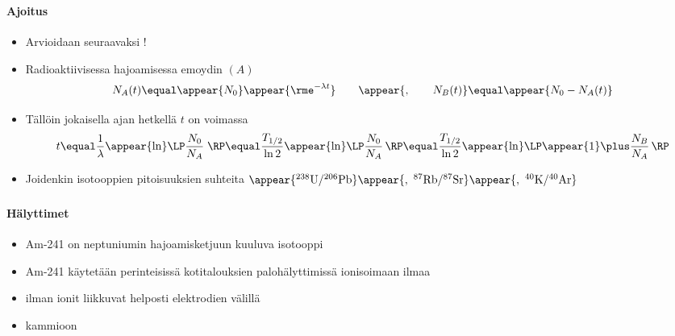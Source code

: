 \begin{frame}
\frametitle{\texorpdfstring{\culine[\sectiontitleulinecolor]{\sectiontitle}}{\sectiontitle} }
\framesubtitle{Ajoitus}
\appear{}

\begin{itemize}
	\item Arvioidaan seuraavaksi !

\item Radioaktiivisessa hajoamisessa emoydin $(A)$  
\[
N_{A}(t)  \equal \appear{N_{0}} \appear{\rme^{-\lambda t}} \qquad \appear{, \qquad N_{B}(t)}  \equal \appear{N_{0}-N_{A}(t)}
\]

\item Tällöin jokaisella ajan hetkellä $t$ on voimassa 
\[
t \equal \frac{1}{\lambda} \appear{\ln} \LP \frac{N_{0}}{N_{A}} \;\RP  \equal \frac{T_{1 / 2}}{\ln 2} \appear{\ln} \LP \frac{N_{0}}{N_{A}} \,\RP  \equal \frac{T_{1 / 2}}{\ln 2} \appear{\ln} \LP \appear{1} \plus \frac{N_{B}}{N_{A}} \,\RP
\]

\item Joidenkin isotooppien pitoisuuksien suhteita \appear{(}$\appear{{ }^{238} \mathrm{U} /{ }^{206} \mathrm{Pb}}\appear{,~{ }^{87} \mathrm{Rb} /{ }^{87} \mathrm{Sr}}\appear{,~{ }^{40} \mathrm{K} /{ }^{40} \mathrm{Ar}}$\appear{)} 
\end{itemize}

\endofslide 
\end{frame}

\begin{frame}
\frametitle{\texorpdfstring{\culine[\sectiontitleulinecolor]{\sectiontitle}}{\sectiontitle} }
\framesubtitle{Hälyttimet}
\appear{}

\begin{itemize}
	\item Am-241 on neptuniumin hajoamisketjuun kuuluva isotooppi
	
	\item Am-241 käytetään perinteisissä kotitalouksien palohälyttimissä ionisoimaan ilmaa

\item {} ilman ionit liikkuvat helposti elektrodien välillä 

\item {} kammioon 
\end{itemize}

\endofslide 
\end{frame}

